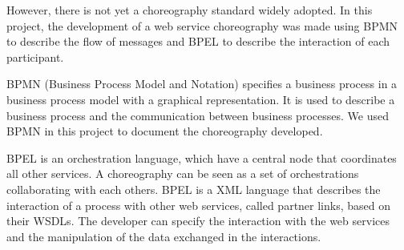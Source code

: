 However, there is not yet a choreography standard widely adopted. In this project, the development of a web service choreography was made using BPMN to describe the flow of messages and BPEL to describe the interaction of each participant. 

BPMN (Business Process Model and Notation) specifies a business process in a business process model with a graphical representation. It is used to describe a business process and the communication between business processes. We used BPMN in this project to document the choreography developed.

BPEL is an orchestration language, which have a central node that coordinates all other services. A choreography can be seen as a set of orchestrations collaborating with each others. BPEL is a XML language that describes the interaction of a process with other web services, called partner links, based on their WSDLs. The developer can specify the interaction with the web services and the manipulation of the data exchanged in the interactions.


